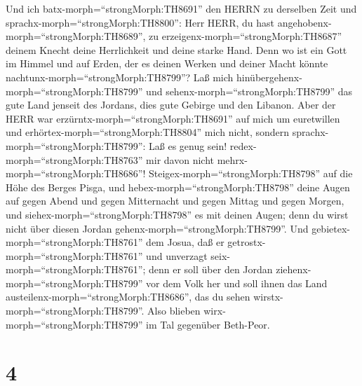 Und ich batx-morph=``strongMorph:TH8691'' den HERRN zu
derselben Zeit und sprachx-morph=``strongMorph:TH8800'': 
Herr HERR, du hast angehobenx-morph=``strongMorph:TH8689'', zu
erzeigenx-morph=``strongMorph:TH8687'' deinem Knecht deine Herrlichkeit
und deine starke Hand. Denn wo ist ein Gott im Himmel und auf Erden, der
es deinen Werken und deiner Macht könnte
nachtunx-morph=``strongMorph:TH8799''?  Laß mich
hinübergehenx-morph=``strongMorph:TH8799'' und
sehenx-morph=``strongMorph:TH8799'' das gute Land jenseit des Jordans,
dies gute Gebirge und den Libanon.  Aber der HERR war
erzürntx-morph=``strongMorph:TH8691'' auf mich um euretwillen und
erhörtex-morph=``strongMorph:TH8804'' mich nicht, sondern
sprachx-morph=``strongMorph:TH8799'': Laß es genug sein!
redex-morph=``strongMorph:TH8763'' mir davon nicht
mehrx-morph=``strongMorph:TH8686''! 
Steigex-morph=``strongMorph:TH8798'' auf die Höhe des Berges Pisga, und
hebex-morph=``strongMorph:TH8798'' deine Augen auf gegen Abend und gegen
Mitternacht und gegen Mittag und gegen Morgen, und
siehex-morph=``strongMorph:TH8798'' es mit deinen Augen; denn du wirst
nicht über diesen Jordan gehenx-morph=``strongMorph:TH8799''.
 Und gebietex-morph=``strongMorph:TH8761'' dem Josua, daß
er getrostx-morph=``strongMorph:TH8761'' und unverzagt
seix-morph=``strongMorph:TH8761''; denn er soll über den Jordan
ziehenx-morph=``strongMorph:TH8799'' vor dem Volk her und soll ihnen das
Land austeilenx-morph=``strongMorph:TH8686'', das du sehen
wirstx-morph=``strongMorph:TH8799''.  Also blieben
wirx-morph=``strongMorph:TH8799'' im Tal gegenüber Beth-Peor.

\hypertarget{section-3}{%
\section{4}\label{section-3}}

